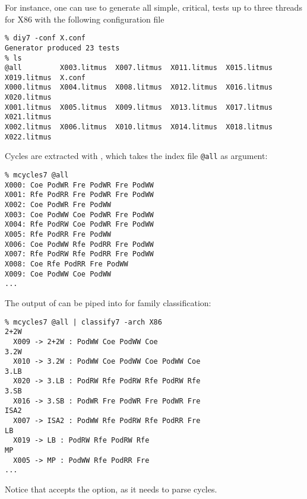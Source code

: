 For instance, one can use \diy{} to generate all simple, critical, tests up
to three threads for X86 with the following configuration file~

\begin{verbatim}
% diy7 -conf X.conf
Generator produced 23 tests
% ls
@all         X003.litmus  X007.litmus  X011.litmus  X015.litmus  X019.litmus  X.conf
X000.litmus  X004.litmus  X008.litmus  X012.litmus  X016.litmus  X020.litmus
X001.litmus  X005.litmus  X009.litmus  X013.litmus  X017.litmus  X021.litmus
X002.litmus  X006.litmus  X010.litmus  X014.litmus  X018.litmus  X022.litmus
\end{verbatim}
Cycles are extracted with \mcycles, which takes the index file \texttt{@all} as argument:
\begin{verbatim}
% mcycles7 @all
X000: Coe PodWR Fre PodWR Fre PodWW
X001: Rfe PodRR Fre PodWR Fre PodWW
X002: Coe PodWR Fre PodWW
X003: Coe PodWW Coe PodWR Fre PodWW
X004: Rfe PodRW Coe PodWR Fre PodWW
X005: Rfe PodRR Fre PodWW
X006: Coe PodWW Rfe PodRR Fre PodWW
X007: Rfe PodRW Rfe PodRR Fre PodWW
X008: Coe Rfe PodRR Fre PodWW
X009: Coe PodWW Coe PodWW
...
\end{verbatim}
The output of \mcycles{} can be piped into \classify{} for family
classification:
\begin{verbatim}
% mcycles7 @all | classify7 -arch X86
2+2W
  X009 -> 2+2W : PodWW Coe PodWW Coe
3.2W
  X010 -> 3.2W : PodWW Coe PodWW Coe PodWW Coe
3.LB
  X020 -> 3.LB : PodRW Rfe PodRW Rfe PodRW Rfe
3.SB
  X016 -> 3.SB : PodWR Fre PodWR Fre PodWR Fre
ISA2
  X007 -> ISA2 : PodWW Rfe PodRW Rfe PodRR Fre
LB
  X019 -> LB : PodRW Rfe PodRW Rfe
MP
  X005 -> MP : PodWW Rfe PodRR Fre
...
\end{verbatim}
Notice that \classify{} accepts the  option, as it needs
to parse cycles.

